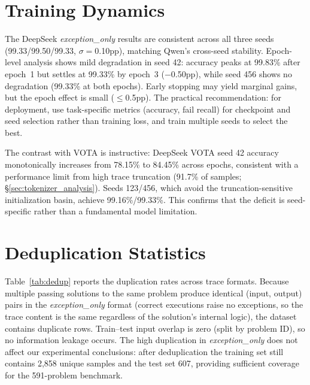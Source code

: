 \section{Training Dynamics}
\label{sec:training_dynamics}


The DeepSeek \textit{exception\_only} results are consistent across all three seeds (99.33/99.50/99.33, $\sigma{=}$0.10pp), matching Qwen's cross-seed stability.
Epoch-level analysis shows mild degradation in seed 42: accuracy peaks at 99.83\% after epoch~1 but settles at 99.33\% by epoch~3 ($-$0.50pp), while seed 456 shows no degradation (99.33\% at both epochs).
Early stopping may yield marginal gains, but the epoch effect is small (${\leq}$0.5pp).
The practical recommendation: for deployment, use task-specific metrics (accuracy, fail recall) for checkpoint and seed selection rather than training loss, and train multiple seeds to select the best.

The contrast with VOTA is instructive: DeepSeek VOTA seed 42 accuracy monotonically increases from 78.15\% to 84.45\% across epochs, consistent with a performance limit from high trace truncation (91.7\% of samples; \S\ref{sec:tokenizer_analysis}).
Seeds 123/456, which avoid the truncation-sensitive initialization basin, achieve 99.16\%/99.33\%. This confirms that the deficit is seed-specific rather than a fundamental model limitation.

\section{Deduplication Statistics}
\label{sec:dedup_stats}

Table~\ref{tab:dedup} reports the duplication rates across trace formats.
Because multiple passing solutions to the same problem produce identical (input, output) pairs in the \textit{exception\_only} format (correct executions raise no exceptions, so the trace content is the same regardless of the solution's internal logic), the dataset contains duplicate rows.
Train--test input overlap is zero (split by problem ID), so no information leakage occurs.
The high duplication in \textit{exception\_only} does not affect our experimental conclusions: after deduplication the training set still contains 2,858 unique samples and the test set 607, providing sufficient coverage for the 591-problem benchmark.


